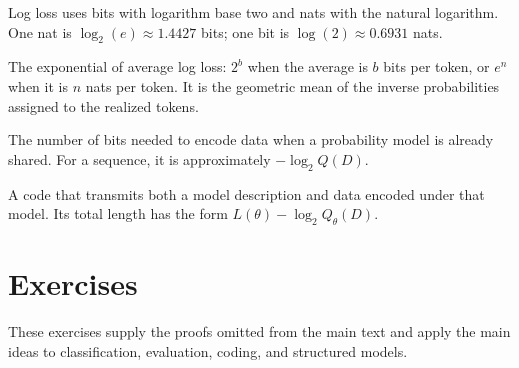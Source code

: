 \documentclass[11pt,twoside]{article}
\theoremstyle{definition}
\theoremstyle{remark}
\begin{document}
\begin{description}[style=nextline,leftmargin=1.5em,labelindent=0pt]
\item[Bits and nats]
Log loss uses bits with logarithm base two and nats with the natural logarithm.
One nat is $\log_2(e)\approx1.4427$ bits; one bit is
$\log(2)\approx0.6931$ nats.
\item[Perplexity]
The exponential of average log loss: $2^b$ when the average is $b$ bits per
token, or $e^n$ when it is $n$ nats per token. It is the geometric mean of the
inverse probabilities assigned to the realized tokens.
\item[Conditional codelength]
The number of bits needed to encode data when a probability model is already
shared. For a sequence, it is approximately $-\log_2Q(D)$.
\item[Two-part code]
A code that transmits both a model description and data encoded under that
model. Its total length has the form $L(\theta)-\log_2Q_\theta(D)$.
\end{description}

\section{Exercises}
\label{sec:exercises}

These exercises supply the proofs omitted from the main text and apply the
main ideas to classification, evaluation, coding, and structured models.

\exerciseinstructions
\setcounter{courseexercise}{0}
\end{document}
